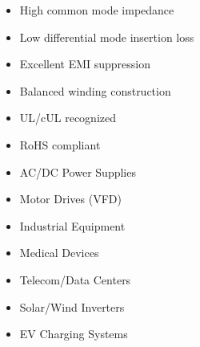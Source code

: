 \documentclass[10pt,a4paper]{article}
\begin{document}
\begin{minipage}[t]{0.32\textwidth}

\noindent{\normalsize\bfseries\textcolor{wurthred}{Features}}
\vspace{1mm}
{\footnotesize
\begin{itemize}
    \setlength{\itemsep}{0pt}
    \setlength{\parskip}{0pt}
    \item High common mode impedance
    \item Low differential mode insertion loss
    \item Excellent EMI suppression
    \item Balanced winding construction
    \item UL/cUL recognized
    \item RoHS compliant
\end{itemize}
}

\vspace{3mm}

\noindent{\normalsize\bfseries\textcolor{wurthred}{Applications}}
\vspace{1mm}
{\footnotesize
\begin{itemize}
    \setlength{\itemsep}{0pt}
    \setlength{\parskip}{0pt}
    \item AC/DC Power Supplies
    \item Motor Drives (VFD)
    \item Industrial Equipment
    \item Medical Devices
    \item Telecom/Data Centers
    \item Solar/Wind Inverters
    \item EV Charging Systems
\end{itemize}
}

\end{minipage}
\hfill
\end{document}
